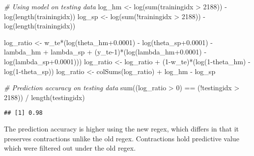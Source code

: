\documentclass[
]{article}
\newenvironment{Shaded}{\begin{snugshade}}{\end{snugshade}}
\newcommand{\CommentTok}[1]{\textcolor[rgb]{0.56,0.35,0.01}{\textit{#1}}}
\newcommand{\DecValTok}[1]{\textcolor[rgb]{0.00,0.00,0.81}{#1}}
\newcommand{\FloatTok}[1]{\textcolor[rgb]{0.00,0.00,0.81}{#1}}
\newcommand{\FunctionTok}[1]{\textcolor[rgb]{0.00,0.00,0.00}{#1}}
\newcommand{\NormalTok}[1]{#1}
\newcommand{\OtherTok}[1]{\textcolor[rgb]{0.56,0.35,0.01}{#1}}
\newcommand{\SpecialCharTok}[1]{\textcolor[rgb]{0.00,0.00,0.00}{#1}}
\begin{document}
\begin{Shaded}
\begin{Highlighting}[]
\CommentTok{\# Using model on testing data}
\NormalTok{log\_hm }\OtherTok{\textless{}{-}} \FunctionTok{log}\NormalTok{(}\FunctionTok{sum}\NormalTok{(trainingidx }\SpecialCharTok{\textgreater{}} \DecValTok{2188}\NormalTok{)) }\SpecialCharTok{{-}} \FunctionTok{log}\NormalTok{(}\FunctionTok{length}\NormalTok{(trainingidx))}
\NormalTok{log\_sp }\OtherTok{\textless{}{-}} \FunctionTok{log}\NormalTok{(}\FunctionTok{sum}\NormalTok{(}\SpecialCharTok{!}\NormalTok{trainingidx }\SpecialCharTok{\textgreater{}} \DecValTok{2188}\NormalTok{)) }\SpecialCharTok{{-}} \FunctionTok{log}\NormalTok{(}\FunctionTok{length}\NormalTok{(trainingidx))}

\NormalTok{log\_ratio }\OtherTok{\textless{}{-}}\NormalTok{ w\_te}\SpecialCharTok{*}\NormalTok{(}\FunctionTok{log}\NormalTok{(theta\_hm}\FloatTok{+0.0001}\NormalTok{) }\SpecialCharTok{{-}} \FunctionTok{log}\NormalTok{(theta\_sp}\FloatTok{+0.0001}\NormalTok{) }\SpecialCharTok{{-}}\NormalTok{ lambda\_hm }\SpecialCharTok{+}\NormalTok{ lambda\_sp }
                   \SpecialCharTok{+}\NormalTok{ (y\_te}\DecValTok{{-}1}\NormalTok{)}\SpecialCharTok{*}\NormalTok{(}\FunctionTok{log}\NormalTok{(lambda\_hm}\FloatTok{+0.0001}\NormalTok{) }\SpecialCharTok{{-}} \FunctionTok{log}\NormalTok{(lambda\_sp}\FloatTok{+0.0001}\NormalTok{)))}
\NormalTok{log\_ratio }\OtherTok{\textless{}{-}}\NormalTok{ log\_ratio }\SpecialCharTok{+}\NormalTok{ (}\DecValTok{1}\SpecialCharTok{{-}}\NormalTok{w\_te)}\SpecialCharTok{*}\NormalTok{(}\FunctionTok{log}\NormalTok{(}\DecValTok{1}\SpecialCharTok{{-}}\NormalTok{theta\_hm) }\SpecialCharTok{{-}} \FunctionTok{log}\NormalTok{(}\DecValTok{1}\SpecialCharTok{{-}}\NormalTok{theta\_sp))}
\NormalTok{log\_ratio }\OtherTok{\textless{}{-}} \FunctionTok{colSums}\NormalTok{(log\_ratio) }\SpecialCharTok{+}\NormalTok{ log\_hm }\SpecialCharTok{{-}}\NormalTok{ log\_sp}

\CommentTok{\# Prediction accuracy on testing data}
\FunctionTok{sum}\NormalTok{((log\_ratio }\SpecialCharTok{\textgreater{}} \DecValTok{0}\NormalTok{) }\SpecialCharTok{==}\NormalTok{ (}\SpecialCharTok{!}\NormalTok{testingidx }\SpecialCharTok{\textgreater{}} \DecValTok{2188}\NormalTok{)) }\SpecialCharTok{/} \FunctionTok{length}\NormalTok{(testingidx)}
\end{Highlighting}
\end{Shaded}

\begin{verbatim}
## [1] 0.98
\end{verbatim}

The prediction accuracy is higher using the new regex, which differs in
that it preserves contractions unlike the old regex. Contractions hold
predictive value which were filtered out under the old regex.
\end{document}
